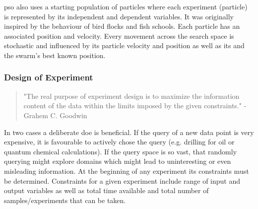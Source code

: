 \Gls{pso} also uses a starting population of particles where each experiment (particle) 
is represented by its independent and dependent variables. 
It was originally inspired by the behaviour of bird flocks and fish schools\cite{Kennedy1995}.
Each particle has an associated position and velocity. 
Every movement across the search space is stochastic and influenced by its particle velocity and position as well as its and the swarm's best known position.

\subsubsection{Design of Experiment} %
%
\begin{quote}
	{"The real purpose of experiment design is to maximize the information content of the data within the limits imposed by the given constraints."}
	- {Grahem C. Goodwin\cite{goodwin1977experiment}}
\end{quote}
%
In two cases a deliberate \gls{doe} is beneficial.
If the query of a new data point is very expensive, it is favourable to actively chose the query (e.g. drilling for oil or quantum chemical calculations). 
If the query space is so vast, that randomly querying might explore domains which might lead to uninteresting or even misleading information.
% 
At the beginning of any experiment its constraints must be determined. 
%
Constraints for a given experiment include range of input and output variables as well as total time available and total number of samples/experiments that can be taken.\cite{goodwin1977experiment}
%

